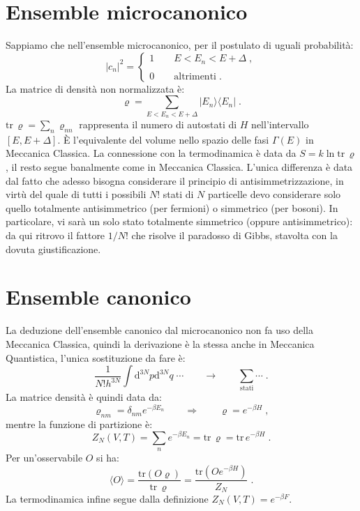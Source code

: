 \documentclass[10pt,a4paper]{report}
\theoremstyle{definition}
\numberwithin{equation}{section}
\newcommand{\diff}[1][]{\mathrm{d}#1}
\newcommand{\bra}{\langle}
\newcommand{\ket}{\rangle}
\newcommand{\tr}{\mathrm{tr}}
\begin{document}
\section{Ensemble microcanonico}
Sappiamo che nell'ensemble microcanonico, per il postulato di uguali probabilità:
$$
|c_n|^2=\begin{cases}
1\qquad E<E_n<E+\Delta\;, \\
\\
0\qquad \mbox{altrimenti}\;.
\end{cases}
$$
La matrice di densità non normalizzata è:
\begin{equation}
\varrho=\sum_{E<E_n<E+\Delta}|E_n\ket\bra E_n|\;.
\end{equation}
$\tr\,\varrho=\sum_n\varrho_{nn}$ rappresenta il numero di autostati di $H$ nell'intervallo $[E,E+\Delta]$. È l'equivalente del volume nello spazio delle fasi $\Gamma(E)$ in Meccanica Classica. La connessione con la termodinamica è data da $S=k\ln\tr\,\varrho$, il resto segue banalmente come in Meccanica Classica. L'unica differenza è data dal fatto che adesso bisogna considerare il principio di antisimmetrizzazione, in virtù del quale di tutti i possibili $N!$ stati di $N$ particelle devo considerare solo quello totalmente antisimmetrico (per fermioni) o simmetrico (per bosoni). In particolare, vi sarà un solo stato totalmente simmetrico (oppure antisimmetrico): da qui ritrovo il fattore $1/N!$ che risolve il paradosso di Gibbs, stavolta con la dovuta giustificazione.
\section{Ensemble canonico}
La deduzione dell'ensemble canonico dal microcanonico non fa uso della Meccanica Classica, quindi la derivazione è la stessa anche in Meccanica Quantistica, l'unica sostituzione da fare è:
$$
\frac{1}{N!h^{3N}}\int\diff^{3N}{p}\diff^{3N}{q}\;\cdots \qquad \longrightarrow \qquad \sum_{\mbox{stati}} \cdots\;.
$$
La matrice densità è quindi data da:
\begin{equation}
\varrho_{nm}=\delta_{nm}e^{-\beta E_n}\qquad \Longrightarrow \qquad \varrho=e^{-\beta H}\;,
\end{equation}
mentre la funzione di partizione è:
\begin{equation}
Z_N(V,T)=\sum_n e^{-\beta E_n}=\tr\,\varrho=\tr\, e^{-\beta H}\;.
\end{equation}
Per un'osservabile $O$ si ha:
\begin{equation}
\bra O\ket =\frac{\tr (O\varrho)}{\tr\,\varrho}=\frac{\tr (Oe^{-\beta H})}{Z_N}\;.
\end{equation}
La termodinamica infine segue dalla definizione $Z_N(V,T)=e^{-\beta F}$.
\end{document}
